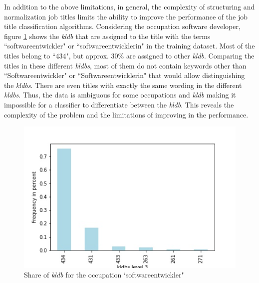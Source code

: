 \documentclass[12pt, a4paper, titlepage]{article}
\begin{document}
In addition to the above limitations, in general, the complexity of structuring and normalization job titles limits the ability to improve the performance of the job title classification algorithms. Considering the occupation software developer, figure \ref{fig: F27} shows the \textit{kldb} that are assigned to the title with the terms ``softwareentwickler" or ``softwareentwicklerin" in the training dataset. Most of the titles belong to ``434", but approx. $30\%$ are assigned to other \textit{kldb}. Comparing the titles in these different \textit{kldbs}, most of them do not contain keywords other than ``Softwareentwickler" or ``Softwareentwicklerin" that would allow distinguishing the \textit{kldbs}. There are even titles with exactly the same wording in the different \textit{kldbs}. Thus, the data is ambiguous for some occupations and \textit{kldb} making it impossible for a classifier to differentiate between the \textit{kldb}. This reveals the complexity of the problem and the limitations of improving in the performance. 

\begin{figure}[hb!]
  \center
  \includegraphics[scale=0.5]{kldbs_frequency_softwareentwickler.jpg}
  \caption{\label{fig: F27} Share of \textit{kldb} for the occupation `softwareentwickler"}
\end{figure}
\end{document}
